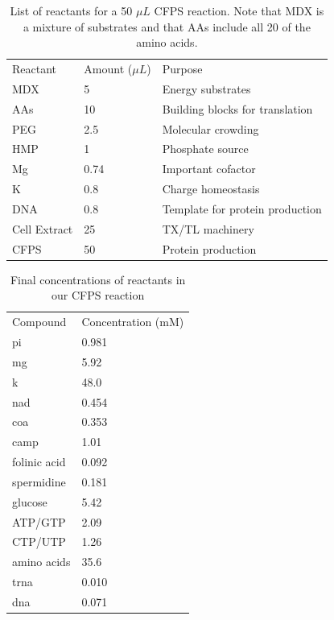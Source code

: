 \begin{table}[]
\centering
\caption{List of reactants for a 50 $\mu L$ CFPS reaction. 
Note that MDX is a mixture of substrates and that AAs include all 20 of the amino acids.}
\label{tab:cf-nrg}
\begin{tabular}{lll}
Reactant     & Amount ($\mu L$) & Purpose                         \\
MDX          & 5               & Energy substrates               \\
AAs          & 10              & Building blocks for translation \\
PEG          & 2.5             & Molecular crowding              \\
HMP          & 1               & Phosphate source                \\
Mg           & 0.74            & Important cofactor              \\
K            & 0.8             & Charge homeostasis              \\
DNA          & 0.8             & Template for protein production  \\
Cell Extract & 25              & TX/TL machinery                 \\ \hline
CFPS         & 50              & Protein production             
\end{tabular}
\end{table}

\begin{table}[]
\centering
\caption{Final concentrations of reactants in our CFPS reaction}
\label{tab:cf-conc}
\begin{tabular}{ll}
Compound     & Concentration (mM) \\
pi           & 0.981              \\
mg           & 5.92               \\
k            & 48.0               \\
nad          & 0.454              \\
coa          & 0.353              \\
camp         & 1.01               \\
folinic acid & 0.092              \\
spermidine   & 0.181              \\
glucose      & 5.42               \\
ATP/GTP      & 2.09               \\
CTP/UTP      & 1.26               \\
amino acids  & 35.6               \\
trna         & 0.010              \\
dna          & 0.071             
\end{tabular}
\end{table}

